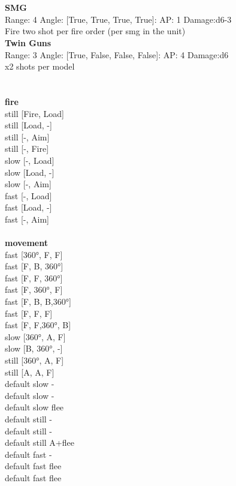 \ \\

\ \\
{\bf SMG } \\



Range: 4  Angle: [True, True, True, True]: AP: 1 Damage:d6-3 \\
Fire two shot per fire order (per smg in the unit)\\ 




{\bf Twin Guns } \\



Range: 3  Angle: [True, False, False, False]: AP: 4 Damage:d6 \\
x2 shots per model\\ 




 
\ \\



\ \\ {\bf fire } \\
still [Fire, Load] \\
still [Load, -] \\
still [-, Aim] \\
still [-, Fire] \\
slow [-, Load] \\
slow [Load, -] \\
slow [-, Aim] \\
fast [-, Load] \\
fast [Load, -] \\
fast [-, Aim] \\
\ \\ {\bf movement } \\
fast [360°, F, F] \\
fast [F, B, 360°] \\
fast [F, F, 360°] \\
fast [F, 360°, F] \\
fast [F, B, B,360°] \\
fast [F, F, F] \\
fast [F, F,360°, B] \\
slow [360°, A, F] \\
slow [B, 360°, -] \\
still [360°, A, F] \\
still [A, A, F] \\
default slow - \\
default slow - \\
default slow flee \\
default still - \\
default still - \\
default still A+flee \\
default fast - \\
default fast flee \\
default fast flee \\


